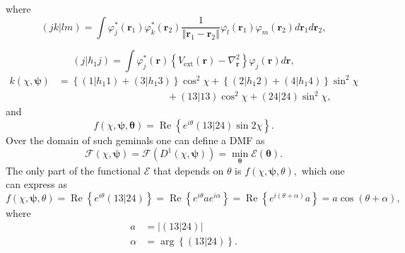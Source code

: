 \documentclass[aps,preprint]{revtex4}%
\begin{document}
where
\begin{equation}
\left(  \left.  jk\right\vert lm\right)  =\int\varphi_{j}^{\ast}\left(
\bm{r}_{1}\right)  \varphi_{k}^{\ast}\left(  \bm{r}_{2}\right)  \frac
{1}{\left\Vert \bm{r}_{1}-\bm{r}_{2}\right\Vert }\varphi_{l}\left(
\bm{r}_{1}\right)  \varphi_{m}\left(  \bm{r}_{2}\right)  d\bm{r}_{1}%
d\bm{r}_{2},
\end{equation}
%

\begin{equation}
\left(  j\left\vert h_{1}j\right.  \right)  =\int\varphi_{j}^{\ast}\left(
\bm{r}\right)  \left\{  V_{\text{ext}}\left(  \bm{r}\right)  -\nabla
_{\bm{r}}^{2}\right\}  \varphi_{j}\left(  \bm{r}\right)  d\bm{r,}
\end{equation}%
\begin{align}
k\left(  \chi,\bm{\psi}\right)   &  =\left\{  \left(  1\left\vert
h_{1}1\right.  \right)  +\left(  3\left\vert h_{1}3\right.  \right)  \right\}
\cos^{2}\chi+\left\{  \left(  2\left\vert h_{1}2\right.  \right)  +\left(
4\left\vert h_{1}4\right.  \right)  \right\}  \sin^{2}\chi\nonumber\\
&  \qquad\qquad\qquad\qquad\qquad\quad+\left(  \left.  13\right\vert
13\right)  \cos^{2}\chi+\left(  \left.  24\right\vert 24\right)  \sin^{2}\chi,
\end{align}
and
\begin{equation}
f\left(  \chi,\bm{\psi,\theta}\right)  =\operatorname{Re}\left\{  e^{i\theta
}\left(  \left.  13\right\vert 24\right)  \sin2\chi\right\}  .
\end{equation}
Over the domain of such geminals one can define a DMF as
\begin{equation}
\mathcal{F}\left(  \chi,\bm{\psi}\right)  =\mathcal{F}\left(  D^{1}\left(
\chi,\bm{\psi}\right)  \right)  =\min_{\bm{\theta}}\mathcal{E}\left(
\bm{\theta}\right)  .
\end{equation}
The only part of the functional $\mathcal{E}$ that depends on $\theta$ is
$f\left(  \chi,\bm{\psi,}\theta\right)  ,$ which one can express as
\begin{equation}
f\left(  \chi,\bm{\psi,}\theta\right)  =\operatorname{Re}\left\{  e^{i\theta
}\left(  \left.  13\right\vert 24\right)  \right\}  =\operatorname{Re}\left\{
e^{i\theta}ae^{i\alpha}\right\}  =\operatorname{Re}\left\{  e^{i\left(
\theta+\alpha\right)  }a\right\}  =a\cos\left(  \theta+\alpha\right)  ,
\end{equation}
where
\begin{align}
a  &  =\left\vert \left(  \left.  13\right\vert 24\right)  \right\vert \\
\alpha &  =\arg\left\{  \left(  \left.  13\right\vert 24\right)  \right\}  .
\end{align}
\end{document}
